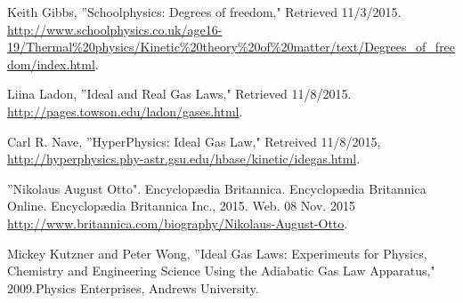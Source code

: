 \documentclass[11pt,letterpaper,onecolumn]{article}
\begin{document}
\begin{thebibliography}{9}

Keith Gibbs, ''Schoolphysics: Degrees of freedom," Retrieved 11/3/2015.
\url{http://www.schoolphysics.co.uk/age16-19/Thermal\%20physics/Kinetic\%20theory\%20of\%20matter/text/Degrees_of_freedom/index.html}.

Liina Ladon, ''Ideal and Real Gas Laws," Retrieved 11/8/2015.
\url{http://pages.towson.edu/ladon/gases.html}.

Carl R. Nave, ''HyperPhysics: Ideal Gas Law," Retreived 11/8/2015, \url{http://hyperphysics.phy-astr.gsu.edu/hbase/kinetic/idegas.html}.

''Nikolaus August Otto". Encyclopædia Britannica. Encyclopædia Britannica Online.
Encyclopædia Britannica Inc., 2015. Web. 08 Nov. 2015
\url{http://www.britannica.com/biography/Nikolaus-August-Otto}.

Mickey Kutzner and Peter Wong, ''Ideal Gas Laws: Experiments for Physics, Chemistry and Engineering Science Using the Adiabatic Gas Law Apparatus," 2009.Physics Enterprises, Andrews University.  


\end{thebibliography}

\end{document}
